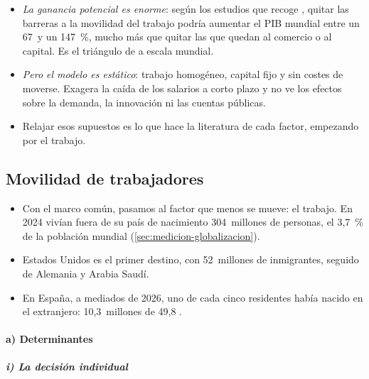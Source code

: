 \documentclass[11pt]{article}
\begin{document}
\begin{itemize}
\item \emph{La ganancia potencial es enorme}: según los estudios que recoge \textcite{Clemens2011Emigration}, quitar las barreras a la movilidad del trabajo podría aumentar el PIB mundial entre un 67~y un 147~\%, mucho más que quitar las que quedan al comercio o al capital. Es el triángulo de  a escala mundial.
\item \emph{Pero el modelo es estático}: trabajo homogéneo, capital fijo y sin costes de moverse. Exagera la caída de los salarios a corto plazo y no ve los efectos sobre la demanda, la innovación ni las cuentas públicas.
\item Relajar esos supuestos es lo que hace la literatura de cada factor, empezando por el trabajo.
\end{itemize}

\subsection{Movilidad de trabajadores}\label{sec:trabajo}

\begin{itemize}
\item Con el marco común, pasamos al factor que menos se mueve: el trabajo. En 2024 vivían fuera de su país de nacimiento 304~millones de personas, el 3,7~\% de la población mundial (\ref{sec:medicion-globalizacion})\nocite{ONU2025MigrantStock}.
\item Estados Unidos es el primer destino, con 52~millones de inmigrantes, seguido de Alemania y Arabia Saudí\nocite{ONU2025MigrantStock}.
\item En España, a mediados de 2026, uno de cada cinco residentes había nacido en el extranjero: 10,3~millones de 49,8\nocite{INE2026ECP2T} .
\end{itemize}

\paragraph{a) Determinantes}

\subparagraph{i) La decisión individual}
\end{document}
